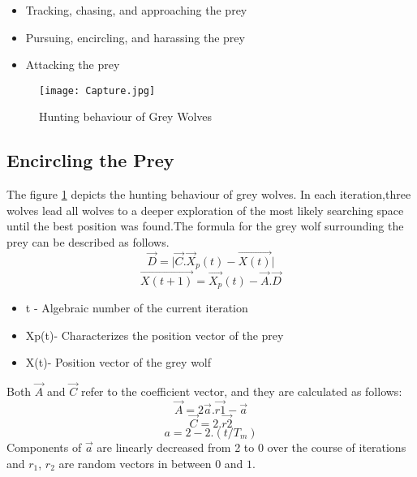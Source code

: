 \documentclass[11pt]{report}
\begin{document}
\begin{itemize}
\item Tracking, chasing, and approaching the prey 
\item Pursuing, encircling, and harassing the prey 
\item Attacking the prey
\end{itemize}

\begin{figure}[!h]
\begin{center}
     \texttt{[image: Capture.jpg]}
     \caption {Hunting behaviour of Grey Wolves }
     \label{hunting}
     \end{center}
\end{figure}

\subsection{Encircling the Prey}
The figure \ref{hunting} depicts the hunting behaviour of grey wolves.
In each iteration,three wolves lead all wolves to a deeper exploration of the most likely searching space until the best position was found.The formula for the grey wolf surrounding the prey can be described as follows.
\begin{equation}
\vec{D} = \lvert \vec{C}.\vec{X}_{p}(t)-\vec{X(t)} \rvert
\end{equation}
\begin{equation}
\vec{X(t+1)} =\vec{X_{p}}(t) -\vec{A}.\vec{D}
\end{equation}
\begin{itemize}
\item  t - Algebraic number of the current iteration
\item Xp(t)- Characterizes the position vector of the prey
\item X(t)- Position vector of the grey wolf 
\end{itemize}
Both $\vec{A}$ and $\vec{C}$ refer to the coefficient vector, and they are calculated as follows:
\begin{equation}
\vec{A} =2\vec{a}.\vec{r1}-\vec{a}
\end{equation}
\begin{equation}
\vec{C} =2.\vec{r2}
\end{equation}
\begin{equation}
a = 2 - 2.(t/T_m)
\end{equation}
Components of $\vec{a}$ are linearly decreased from 2 to 0 over the course of iterations and $r_1$, $r_2$ are random 
vectors in between $0$ and $1$.
\end{document}
